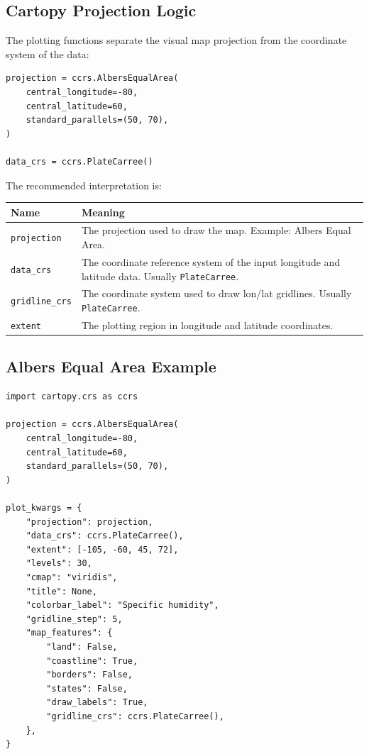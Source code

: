 \documentclass[11pt,a4paper]{article}
\begin{document}
\subsection{Cartopy Projection Logic}

The plotting functions separate the visual map projection from the coordinate system of the data:

\begin{lstlisting}[style=pythonstyle]
projection = ccrs.AlbersEqualArea(
    central_longitude=-80,
    central_latitude=60,
    standard_parallels=(50, 70),
)

data_crs = ccrs.PlateCarree()
\end{lstlisting}

The recommended interpretation is:

\begin{longtable}{p{}p{}}
\toprule
\textbf{Name} & \textbf{Meaning} \\
\midrule
\endhead

\texttt{projection} &
The projection used to draw the map. Example: Albers Equal Area. \\

\texttt{data\_crs} &
The coordinate reference system of the input longitude and latitude data. Usually \texttt{PlateCarree}. \\

\texttt{gridline\_crs} &
The coordinate system used to draw lon/lat gridlines. Usually \texttt{PlateCarree}. \\

\texttt{extent} &
The plotting region in longitude and latitude coordinates. \\

\bottomrule
\end{longtable}

\subsection{Albers Equal Area Example}

\begin{lstlisting}[style=pythonstyle]
import cartopy.crs as ccrs

projection = ccrs.AlbersEqualArea(
    central_longitude=-80,
    central_latitude=60,
    standard_parallels=(50, 70),
)

plot_kwargs = {
    "projection": projection,
    "data_crs": ccrs.PlateCarree(),
    "extent": [-105, -60, 45, 72],
    "levels": 30,
    "cmap": "viridis",
    "title": None,
    "colorbar_label": "Specific humidity",
    "gridline_step": 5,
    "map_features": {
        "land": False,
        "coastline": True,
        "borders": False,
        "states": False,
        "draw_labels": True,
        "gridline_crs": ccrs.PlateCarree(),
    },
}
\end{lstlisting}
\end{document}
